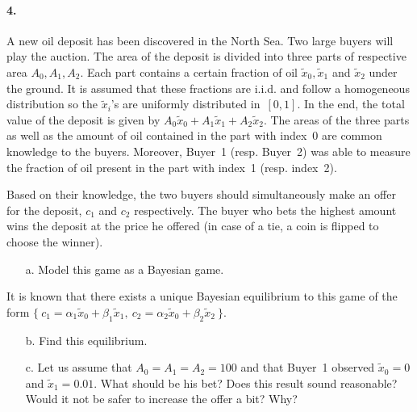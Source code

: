 \documentclass[a4paper,notitlepage,12pt]{article}
\begin{document}
\paragraph{4. } A new oil deposit has been discovered in the North Sea. Two large buyers will play the auction. 
The area of the deposit is divided into three parts of respective area $A_0, A_1, A_2$. Each part contains a certain fraction of oil $\tilde{x}_0, \tilde{x}_1$ and $\tilde{x}_2$ under the ground. It is assumed that these fractions are i.i.d. and follow a homogeneous distribution so the $\tilde{x}_i$'s are uniformly distributed in~$[0, 1]$. In the end, the total value of the deposit is given by $A_0 \tilde{x}_0 + A_1 \tilde{x}_1 + A_2 \tilde{x}_2$. The areas of the three parts as well as the amount of oil contained in the part with index~0 are common knowledge to the buyers. Moreover, Buyer~1 (resp. Buyer~2) was able to measure the fraction of oil present in the part with index~1 (resp. index~2).

Based on their knowledge, the two buyers should simultaneously make an offer for the deposit, $c_1$ and $c_2$ respectively. The buyer who bets the highest amount wins the deposit at the price he offered (in case of a tie, a coin is flipped to choose the winner).
\begin{enumerate}
	\item[a.] Model this game as a Bayesian game.
\end{enumerate}
It is known that there exists a unique Bayesian equilibrium to this game of the form $\{ \ c_1 = \alpha_1 \tilde{x}_0 + \beta_1 \tilde{x}_1, \ c_2 = \alpha_2 \tilde{x}_0 + \beta_2 \tilde{x}_2 \ \}$.
\begin{enumerate}
	\item[b.] Find this equilibrium.
	\item[c.] Let us assume that $A_0 = A_1 = A_2 = 100$ and that Buyer~1 observed $\tilde{x}_0 = 0$ and $\tilde{x}_1 = 0.01$. What should be his bet? Does this result sound reasonable? Would it not be safer to increase the offer a bit? Why?
\end{enumerate}
\end{document}
